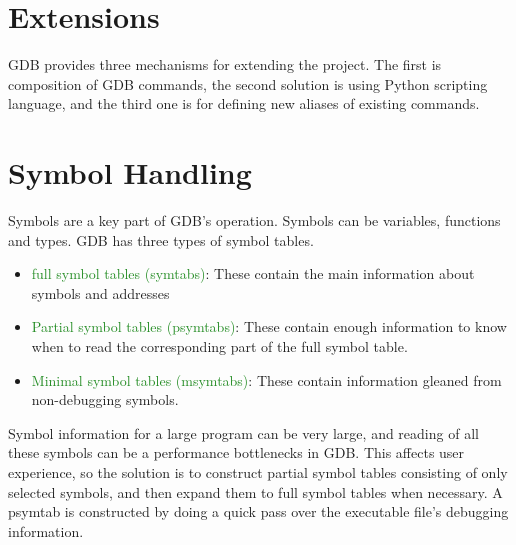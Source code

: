\section{Extensions}
GDB provides three mechanisms for extending the project. The first is
composition of GDB commands, the second solution is using Python scripting
language, and the third one is for defining new aliases of existing commands.

\section{Symbol Handling}
Symbols are a key part of GDB's operation. Symbols can be variables, functions and
types. GDB has three types of symbol tables.
\begin{itemize}
    \item \textcolor{ForestGreen}{full symbol tables (symtabs)}: These contain the main information
        about symbols and addresses
    \item \textcolor{ForestGreen} {Partial symbol tables (psymtabs)}: These contain enough information to
        know when to read the corresponding part of the full symbol table.
    \item \textcolor{ForestGreen}{Minimal symbol tables (msymtabs)}: These contain information gleaned
        from non-debugging symbols.
\end{itemize}

Symbol information for a large program can be very large, and reading of all
these symbols can be a performance bottlenecks in GDB. This affects user
experience, so the solution is to construct partial symbol tables consisting of
only selected symbols, and then expand them to full symbol tables when
necessary.
A psymtab is constructed by doing a quick pass over the executable file's
debugging information.
